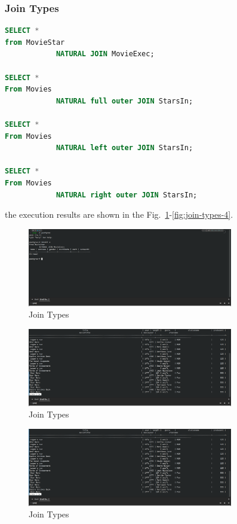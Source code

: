 \documentclass{cshwk}
\begin{document}
\subsubsection{Join Types}

\begin{lstlisting}[language=sql]
SELECT *
from MovieStar
            NATURAL JOIN MovieExec;

SELECT *
From Movies
            NATURAL full outer JOIN StarsIn;

SELECT *
From Movies
            NATURAL left outer JOIN StarsIn;

SELECT *
From Movies
            NATURAL right outer JOIN StarsIn;
\end{lstlisting}

the execution results are shown in the Fig.~\ref{fig:join-types-1}-\ref{fig:join-types-4}.
\begin{figure}[H]
    \centering
    \includegraphics[width=0.8\textwidth]{hw5-11.png}
    \caption{Join Types}
    \label{fig:join-types-1}
\end{figure}

\begin{figure}[H]
    \centering
    \includegraphics[width=0.8\textwidth]{hw5-12.png}
    \caption{Join Types}
    \label{fig:join-types-2}
\end{figure}

\begin{figure}[H]
    \centering
    \includegraphics[width=0.8\textwidth]{hw5-13.png}
    \caption{Join Types}
    \label{fig:join-types-3}
\end{figure}
\end{document}
